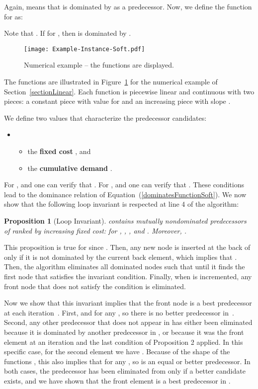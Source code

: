\documentclass[11pt]{article}
\newtheorem{proposition}{Proposition}
\begin{document}
Again,  means that  is dominated by  as a predecessor. 
Now, we define the function  for  as:

Note that .
If  for , then  is dominated by . \\

\begin{figure}[htbp]
\centering
\texttt{[image: Example-Instance-Soft.pdf]}
\caption{Numerical example -- the functions  are displayed.}
\label{figure-soft}
\end{figure}

The functions  are illustrated in Figure~\ref{figure-soft} for the numerical example of Section~\ref{sectionLinear}.
Each function is piecewise linear and continuous with two pieces: a constant piece with value  for  and an increasing piece with slope .

We define two values that characterize the predecessor candidates:
\begin{itemize}[nosep]
\item[]
\begin{itemize}[nosep]
\item the \textbf{fixed cost} , and
\item the \textbf{cumulative demand} .
\end{itemize}
\end{itemize}

For ,  and one can verify that .  
For ,  and one can verify that . These conditions lead to the dominance relation of Equation~(\ref{dominatesFunctionSoft}). We now show that the following loop invariant is respected at line 4 of the algorithm:
\begin{proposition}[Loop Invariant]
 contains mutually nondominated predecessors of  ranked by increasing fixed cost:
for , ,  , and .  Moreover, .
\end{proposition}
This proposition is true for  since .
Then, any new node  is inserted at the back of  only if it is not dominated by the current back element, which implies that . Then, the algorithm eliminates all dominated nodes  such that  until it finds the first node that satisfies the invariant condition. Finally, when  is incremented, any front node that does not satisfy the condition  is eliminated.

Now we show that this invariant implies that the front node is a best predecessor at each iteration~.
First,  and  for any , so there is no better predecessor in~.
Second, any other predecessor  that does not appear in  has either been eliminated because it is dominated by another predecessor in , or because it was the front element at an iteration  and the last condition of Proposition 2 applied. In this specific case, for the second element  we have . Because of the shape of the functions , this also implies that   for any , so  is an equal or better predecessor. In both cases, the predecessor  has been eliminated from  only if a better candidate exists, and we have shown that the front element is a best predecessor in .
\end{document}

